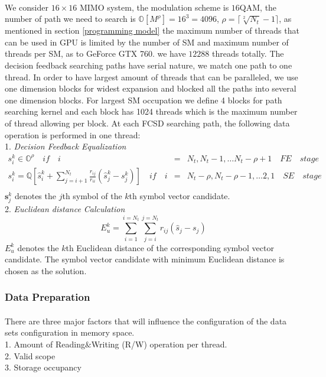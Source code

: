 \documentclass[12pt,a4paper,final]{article}
\begin{document}
\begin{spacing}{2.5}
  \paragraph{}We consider $16\times 16$ MIMO system, the modulation scheme is $16$QAM, the number of path we need to search is $\mathbb{O}[M^{\rho}]=16^{3}=4096$, $\rho=\lceil \sqrt[2]{N_{t}}-1\rceil$, as mentioned in section \ref{programming model} the maximum number of threads that can be used in GPU is limited by the number of SM and maximum number of threads per SM, as to GeForce GTX 760. we have $12288$ threads totally. The decision feedback searching paths have serial nature, we match one path to one thread. In order to have largest amount of threads that can be paralleled, we use one dimension blocks for widest expansion and blocked all the paths into several one dimension blocks. For largest SM occupation we define 4 blocks for path searching kernel and each block has 1024 threads which is the maximum number of thread allowing per block. At each FCSD searching path, the following data operation is performed in one thread:\\
1. \emph{Decision Feedback Equalization}\\
\begin{eqnarray}
\nonumber
{s}_{i}^{k}\in \mathbb{O}^{\rho}      \quad if\quad i&=&N_{t},N_{t}-1,\dots N_{t}-\rho+1\quad FE \quad stage\\
\nonumber
{s}_{i}^{k}=\mathbb{Q}[\hat{s}_{i}^{k}+\sum_{j=i+1}^{N_{t}}\frac{r_{ij}}{r_{ii}}(\hat{s}_{j}^{k}-s_{j}^{k})]\quad if\quad i &=& N_{t}-\rho,N_{t}-\rho-1,\dots 2,1\quad SE\quad stage\\  \label{path searching}
\end{eqnarray}
$\mathbf{s}_{j}^{k}$ denotes the $j$th symbol of the $k$th symbol vector candidate.\\
2. \emph{Euclidean distance Calculation}\\
\begin{equation}
E_{u}^{k}=\sum_{i=1}^{i=N_{t}}\sum_{j=i}^{j=N_{t}}r_{ij}(\hat{s}_{j}-s_{j})\label{Eu metric}
\end{equation}
$E_{u}^{k}$ denotes the $k$th Euclidean distance of the corresponding symbol vector candidate. The symbol vector candidate with minimum Euclidean distance is chosen as the solution.  
\subsubsection{Data Preparation}\label{data preparation}
\paragraph{}There are three major factors that will influence the configuration of the data sets configuration in memory space.\\
1. Amount of Reading$\&$Writing (R/W) operation per thread.\\
2. Valid scope\\
3. Storage occupancy\\

\end{spacing}
\end{document}
